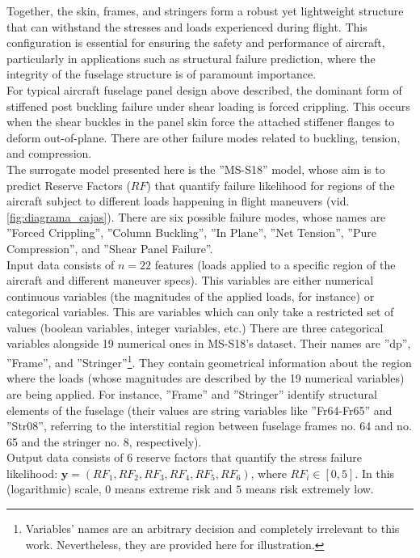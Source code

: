Together, the skin, frames, and stringers form a robust yet lightweight structure that can withstand the stresses and loads experienced during flight. This configuration is essential for ensuring the safety and performance of aircraft, particularly in applications such as structural failure prediction, where the integrity of the fuselage structure is of paramount importance.\\
%
\indent For typical aircraft fuselage panel design above described, the dominant form of stiffened post buckling failure under shear loading is forced crippling\cite{bijlaard1955buckling}. This occurs when the shear buckles in the panel skin force the attached stiffener flanges to deform out-of-plane. There are other failure modes related to buckling, tension, and compression.\\
%
\indent The surrogate model presented here is the ''MS-S18'' model, whose aim is to predict Reserve Factors ($RF$) that quantify failure likelihood for regions of the aircraft subject to different loads happening in flight maneuvers (vid. \autoref{fig:diagrama_cajas}). There are six possible failure modes, whose names are ''Forced Crippling'', ''Column Buckling'', ''In Plane'', ''Net Tension'', ''Pure Compression'', and ''Shear Panel Failure''.\\
%
\indent Input data consists of $n=22$ features (loads applied to a specific region of the aircraft and different maneuver specs). This variables are either numerical continuous variables (the magnitudes of the applied loads, for instance) or categorical variables. This are variables which can only take a restricted set of values (\eg boolean variables, integer variables, etc.) There are three categorical variables alongside 19 numerical ones in MS-S18's dataset. Their names are ''dp'', ''Frame'', and ''Stringer''\footnote{Variables' names are an arbitrary decision and completely irrelevant to this work. Nevertheless, they are provided here for illustration.}. They contain geometrical information about the region where the loads (whose magnitudes are described by the 19 numerical variables) are being applied. For instance, ''Frame'' and ''Stringer'' identify structural elements of the fuselage (their values are string variables like ''Fr64-Fr65'' and ''Str08'', referring to the interstitial region between fuselage frames no. 64 and no. 65 and the stringer no. 8, respectively).\\
%
\indent Output data consists of 6 reserve factors that quantify the stress failure likelihood: $\mathbf{y}=(RF_1,RF_2,RF_3,RF_4,RF_5,RF_6)$, where $RF_i\in [0,5]$. In this (logarithmic) scale, $0$ means extreme risk and $5$ means risk extremely low.\\
